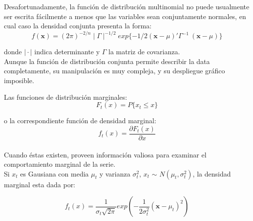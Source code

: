 
Desafortunadamente, la funci\'on de distribuci\'on multinomial no puede usualmente ser escrita f\'acilmente a menos que las variables sean conjuntamente normales, en cual caso la densidad conjunta presenta la forma:
\begin{equation*}
f(\textbf{x}) = (2\pi)^{-2/n}\mid\Gamma\mid^{-1/2} exp \{ -1/2  (\textbf{x} - \mu)' \Gamma^{-1}\ (\textbf{x} - \mu)\}
\end{equation*}

donde $\mid\cdot\mid$ indica determinante y $\Gamma$ la matriz de covarianza.\\
Aunque la funci\'on de distribuci\'on conjunta permite describir la data completamente, su manipulaci\'on es muy compleja, y su despliegue gr\'afico imposible.

Las funciones de distribuci\'on marginales:
\begin{equation*}
F_t(x) = P\{x_t \le x\}
\end{equation*}

o la correspondiente funci\'on de densidad marginal:\\
\begin{equation*}
f_t(x) = \frac{\partial F_t(x)}{\partial x} 
\end{equation*}
\\
Cuando \'estas existen, proveen informaci\'on valiosa para examinar el comportamiento marginal de la serie.
\\
Si $x_t$ es Gausiana con media $\mu_t$ y varianza $\sigma_t^2$, $x_t$ $\sim$ $N(\mu_t,\sigma_t^2)$, la densidad marginal esta dada por:

\begin{equation*}
f_t(x) = \frac{1}{\sigma_t \sqrt{2 \pi}} exp  ( -  \frac{1}{2 \sigma_t^2}  (\textbf{x} - \mu_t)^2 )
\end{equation*}


